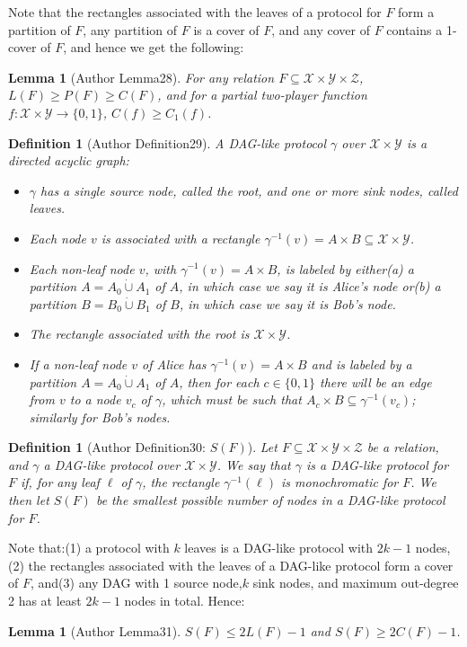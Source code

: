 \documentclass[10pt,a4paper]{article}
\newtheorem{ntdefinition}[nttheorem]{Definition}
\newtheorem{ntlemma}[nttheorem]{Lemma}
\begin{document}
Note that the rectangles associated with the leaves of a protocol for $F$ form a partition of $F$, any partition of $F$ is a cover of $F$, and any cover of $F$ contains a 1-cover of $F$, and hence we get the following:
\begin{ntlemma}[Author Lemma28]
For any relation $F\subseteq\mathcal X\times\mathcal Y\times\mathcal Z$, $L(F)\geq P(F)\geq C(F)$, and for a partial two-player function $f:\mathcal X\times\mathcal Y\to\{0,1\}$, $C(f)\geq C_1(f)$.
\end{ntlemma}
\begin{ntdefinition}[Author Definition29]
A DAG-like protocol $\gamma$ over $\mathcal X\times\mathcal Y$ is a directed acyclic graph:
\begin{itemize}
\item $\gamma$ has a single source node, called the root, and one or more sink nodes, called leaves.
\item Each node $v$ is associated with a rectangle $\gamma^{-1}(v)=A\times B\subseteq\mathcal X\times\mathcal Y$.
\item Each non-leaf node $v$, with $\gamma^{-1}(v)=A\times B$, is labeled by either(a) a partition $A=A_0\mathbin{\dot\cup}A_1$ of $A$, in which case we say it is Alice's node or(b) a partition $B=B_0\mathbin{\dot\cup}B_1$ of $B$, in which case we say it is Bob's node.
\item The rectangle associated with the root is $\mathcal X\times\mathcal Y$.
\item If a non-leaf node $v$ of Alice has $\gamma^{-1}(v)=A\times B$ and is labeled by a partition $A=A_0\mathbin{\dot\cup}A_1$ of $A$, then for each $c\in\{0,1\}$ there will be an edge from $v$ to a node $v_c$ of $\gamma$, which must be such that $A_c\times B\subseteq\gamma^{-1}(v_c)$; similarly for Bob's nodes.
\end{itemize}
\end{ntdefinition}
\begin{ntdefinition}[Author Definition30: $S(F)$]
Let $F\subseteq\mathcal X\times\mathcal Y\times\mathcal Z$ be a relation, and $\gamma$ a DAG-like protocol over $\mathcal X\times\mathcal Y$. We say that $\gamma$ is a DAG-like protocol for $F$ if, for any leaf $\ell$ of $\gamma$, the rectangle $\gamma^{-1}(\ell)$ is monochromatic for $F$. We then let $S(F)$ be the smallest possible number of nodes in a DAG-like protocol for $F$.
\end{ntdefinition}
Note that:(1) a protocol with $k$ leaves is a DAG-like protocol with $2k-1$ nodes,(2) the rectangles associated with the leaves of a DAG-like protocol form a cover of $F$, and(3) any DAG with 1 source node,$k$ sink nodes, and maximum out-degree 2 has at least $2k-1$ nodes in total. Hence:
\begin{ntlemma}[Author Lemma31]
$S(F)\leq2L(F)-1$ and $S(F)\geq2C(F)-1$.
\end{ntlemma}
\end{document}
